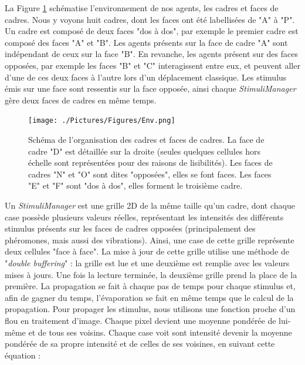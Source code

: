 			La Figure \ref{Env} schématise l'environnement de nos agents, les cadres et faces de cadres. Nous y voyons huit cadres, dont les faces ont été labellisées de "A" à "P". Un cadre est composé de deux faces "dos à dos", par exemple le premier cadre est composé des faces "A" et "B". Les agents présents sur la face de cadre "A" sont indépendant de ceux sur la face "B". En revanche, les agents présent sur des faces opposées, par exemple les faces "B" et "C" interagissent entre eux, et peuvent aller d'une de ces deux faces à l'autre lors d'un déplacement classique. Les stimulus émis sur une face sont ressentis sur la face opposée, ainsi chaque \textit{StimuliManager} gère deux faces de cadres en même temps.
			\begin{figure}
			\centering
			\texttt{[image: ./Pictures/Figures/Env.png]}
			\caption[Schéma vu de côté de l'organisation des cadres et faces de cadres.]{Schéma de l'organisation des cadres et faces de cadres. La face de cadre "D" est détaillée sur la droite (seules quelques cellules hors échelle sont représentées pour des raisons de lisibilités). Les faces de cadres "N" et "O" sont dites "opposées", elles se font faces. Les faces "E" et "F" sont "dos à dos", elles forment le troisième cadre.}
			\label{Env}
			\end{figure}
			
			
			Un \textit{StimuliManager} est une grille 2D de la même taille qu'un cadre, dont chaque case possède plusieurs valeurs réelles, représentant les intensités des différents stimulus présents sur les faces de cadres opposées (principalement des phéromones, mais aussi des vibrations). Ainsi, une case de cette grille représente deux cellules "face à face". La mise à jour de cette grille utilise une méthode de "\textit{double buffering}" : la grille est lue et une deuxième est remplie avec les valeurs mises à jours. Une fois la lecture terminée, la deuxième grille prend la place de la première. La propagation se fait à chaque pas de temps pour chaque stimulus et, afin de gagner du temps, l'évaporation se fait en même temps que le calcul de la propagation. Pour propager les stimulus, nous utilisons une fonction proche d'un flou en traitement d'image. Chaque pixel devient une moyenne pondérée de lui-même et de tous ses voisins. Chaque case voit sont intensité devenir la moyenne pondérée de sa propre intensité et de celles de ses voisines, en suivant cette équation :
			
